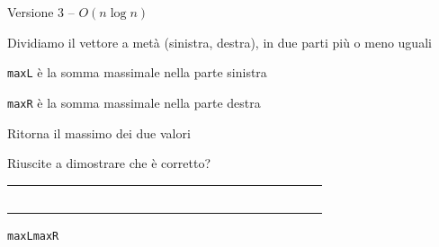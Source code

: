 \begin{frame}[fragile]{Versione 3 -- $O(n \log n)$}

\vspace{-6pt}
\begin{myboxtitle}
\BIL
\item Dividiamo il vettore a metà (sinistra, destra), in due parti più o meno uguali
\item \texttt{maxL} è la somma massimale nella parte sinistra
\item \texttt{maxR} è la somma massimale nella parte destra
\item Ritorna il massimo dei due valori
\item Riuscite a dimostrare che è corretto?
\EIL
\end{myboxtitle}


\begin{center}
\begingroup
\LARGE
\begin{tabular}{!{\vrule width 1.5pt}p{0.30cm}|p{0.30cm}|p{0.30cm}|p{0.30cm}|p{0.30cm}|p{0.30cm}|p{0.30cm}|p{0.30cm}!{\vrule width 1.5pt}p{0.30cm}|p{0.30cm}|p{0.30cm}|p{0.30cm}|p{0.30cm}|p{0.30cm}|p{0.30cm}|p{0.30cm}!{\vrule width 1.5pt}}
~~&&&&&~~&~~&~~&~~&~~&~~&~~&~~&&&\\
\end{tabular}
\endgroup
\end{center}
\Large
\hspace*{1.7cm}\texttt{maxL}\hspace*{7.6cm}\texttt{maxR}

\end{frame}

